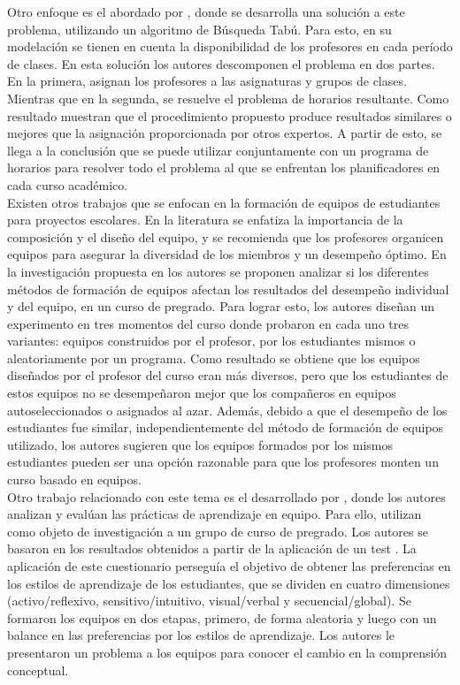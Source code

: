 Otro enfoque es el abordado por \cite{AlvaresValedes2002}, donde se desarrolla una solución a este problema, utilizando un algoritmo de Búsqueda Tabú. Para esto, en su modelación se tienen en cuenta la disponibilidad de los profesores en cada período de clases. En esta solución los autores descomponen el problema en dos partes. En la primera, asignan los profesores a las asignaturas y grupos de clases. Mientras que en la segunda, se resuelve el problema de horarios resultante. Como resultado muestran que el procedimiento propuesto produce resultados similares o mejores que la asignación proporcionada por otros expertos. A partir de esto, se llega a la conclusión que se puede utilizar conjuntamente con un programa de horarios para resolver todo el problema al que se enfrentan los planificadores en cada curso académico.\\

Existen otros trabajos que se enfocan en la formación de equipos de estudiantes para proyectos escolares. En la literatura se enfatiza la importancia de la composición y el diseño del equipo, y se recomienda que los profesores organicen equipos para asegurar la diversidad de los miembros y un desempeño óptimo. En la investigación propuesta en \cite{Pociask2017} los autores se proponen analizar si los diferentes métodos de formación de equipos afectan los resultados del desempeño individual y del equipo, en un curso de pregrado. Para lograr esto, los autores diseñan un experimento en tres momentos del curso donde probaron en cada uno tres variantes: equipos construidos por el profesor, por los estudiantes mismos o aleatoriamente por un programa. Como resultado se obtiene que los equipos diseñados por el profesor del curso eran más diversos, pero que los estudiantes de estos equipos no se desempeñaron mejor que los compañeros en equipos autoseleccionados o asignados al azar. Además, debido a que el desempeño de los estudiantes fue similar, independientemente del método de formación de equipos utilizado, los autores sugieren que los equipos formados por los mismos estudiantes pueden ser una opción razonable para que los profesores monten un curso basado en equipos. \\

Otro trabajo relacionado con este tema es el desarrollado por \cite{Kittur2020}, donde los autores analizan y evalúan las prácticas de aprendizaje en equipo. Para ello, utilizan como objeto de investigación a un grupo de curso de pregrado. Los autores se basaron en los resultados obtenidos a partir de la aplicación de un test \cite{Felder}. La aplicación de este cuestionario perseguía el objetivo de obtener las preferencias en los estilos de aprendizaje de los estudiantes, que se dividen en cuatro dimensiones (activo/reflexivo, sensitivo/intuitivo, visual/verbal y secuencial/global). Se formaron los equipos en dos etapas, primero, de forma aleatoria y luego con un balance en las preferencias por los estilos de aprendizaje. {\color{red}Los autores le presentaron un problema a los equipos para conocer el cambio en la comprensión conceptual.} \\

